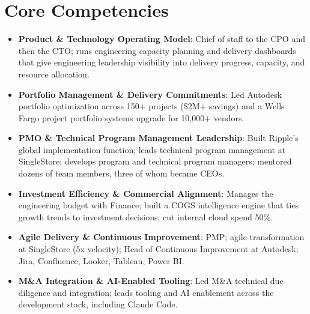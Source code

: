 \documentclass[11pt,letterpaper,sans]{moderncv}
\begin{document}
\section{Core Competencies}
\vspace{1pt}
\begin{itemize}

\item \textbf{Product \& Technology Operating Model}: Chief of staff to the CPO and then the CTO; runs engineering capacity planning and delivery dashboards that give engineering leadership visibility into delivery progress, capacity, and resource allocation.

\item \textbf{Portfolio Management \& Delivery Commitments}: Led Autodesk portfolio optimization across 150+ projects (\$2M+ savings) and a Wells Fargo project portfolio systems upgrade for 10,000+ vendors.

\item \textbf{PMO \& Technical Program Management Leadership}: Built Ripple's global implementation function; leads technical program management at SingleStore; develops program and technical program managers; mentored dozens of team members, three of whom became CEOs.

\item \textbf{Investment Efficiency \& Commercial Alignment}: Manages the engineering budget with Finance; built a COGS intelligence engine that ties growth trends to investment decisions; cut internal cloud spend 50\%.

\item \textbf{Agile Delivery \& Continuous Improvement}: PMP; agile transformation at SingleStore (5x velocity); Head of Continuous Improvement at Autodesk; Jira, Confluence, Looker, Tableau, Power BI.

\item \textbf{M\&A Integration \& AI-Enabled Tooling}: Led M\&A technical due diligence and integration; leads tooling and AI enablement across the development stack, including Claude Code.

\end{itemize}

\end{document}

